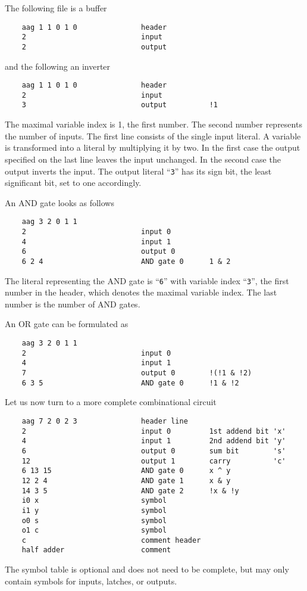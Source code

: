 \documentclass[10pt]{llncs}
\begin{document}
  The following file is a buffer
\begin{verbatim}
    aag 1 1 0 1 0               header
    2                           input
    2                           output
\end{verbatim}
  and the following an inverter
\begin{verbatim}
    aag 1 1 0 1 0               header
    2                           input
    3                           output          !1
\end{verbatim}
  The maximal variable index is 1, the first number.  The second number
  represents the number of inputs.  The first line consists of the single
  input literal.  A variable is transformed into a literal by multiplying
  it by two.  In the first case the output specified on the last line leaves
  the input unchanged.  In the second case the output inverts the input.  The
  output literal ``\texttt{3}'' has its sign bit, the least significant bit, set to one
  accordingly.
  
  An AND gate looks as follows
\begin{verbatim}
    aag 3 2 0 1 1
    2                           input 0
    4                           input 1
    6                           output 0
    6 2 4                       AND gate 0      1 & 2
\end{verbatim}
  The literal representing the AND gate is ``\texttt{6}'' with variable index
  ``\texttt{3}'',
  the first number in the header, which denotes the maximal variable index.
  The last number is the number of AND gates.

  An OR gate can be formulated as
\begin{verbatim}
    aag 3 2 0 1 1
    2                           input 0
    4                           input 1
    7                           output 0        !(!1 & !2)
    6 3 5                       AND gate 0      !1 & !2
\end{verbatim}
  Let us now turn to a more complete combinational circuit
\begin{verbatim}
    aag 7 2 0 2 3               header line
    2                           input 0         1st addend bit 'x'
    4                           input 1         2nd addend bit 'y'
    6                           output 0        sum bit        's'
    12                          output 1        carry          'c'
    6 13 15                     AND gate 0      x ^ y
    12 2 4                      AND gate 1      x & y
    14 3 5                      AND gate 2      !x & !y
    i0 x                        symbol
    i1 y                        symbol
    o0 s                        symbol
    o1 c                        symbol
    c                           comment header
    half adder                  comment
\end{verbatim}
  The symbol table is optional and does not need to be complete, but may
  only contain symbols for inputs, latches, or outputs.
\end{document}
